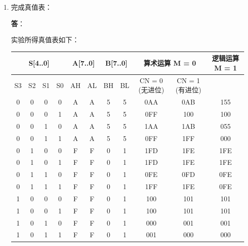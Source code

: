 \begin{enumerate}
    \item 完成真值表：
    
    \textbf{答}：
    
    实验所得真值表如下：
    
    \begin{table}[H]
        \centering
        \begin{tabular}{|c c c c|c c|c c|c|c|c|}
            \hline
            \multicolumn{4}{|c|}{S[4..0]} & \multicolumn{2}{c|}{A[7..0]} & \multicolumn{2}{c}{B[7..0]} & \multicolumn{2}{|c|}{算术运算 M = 0} & 逻辑运算 M = 1 \\
            \hline
            S3 & S2 & S1 & S0 & AH & AL & BH & BL & CN = 0 (无进位) & CN = 1 (有进位) & \\
            \hline
            0 & 0 & 0 & 0 & A & A & 5 & 5 & 0AA & 0AB & \cellcolor[HTML]{FFF9C4}155 \\
            \hline
            0 & 0 & 0 & 1 & A & A & 5 & 5 & 0FF & 100 & \cellcolor[HTML]{FFF9C4}100 \\
            \hline
            0 & 0 & 1 & 0 & A & A & 5 & 5 & \cellcolor[HTML]{FFF9C4}1AA & \cellcolor[HTML]{FFF9C4}1AB & 055 \\
            \hline
            0 & 0 & 1 & 1 & A & A & 5 & 5 & 0FF & \cellcolor[HTML]{FFF9C4}1FF & 000 \\
            \hline
            0 & 1 & 0 & 0 & F & F & 0 & 1 & 1FD & 1FE & \cellcolor[HTML]{FFF9C4}1FE \\
            \hline
            0 & 1 & 0 & 1 & F & F & 0 & 1 & 1FD & 1FE & \cellcolor[HTML]{FFF9C4}1FE \\
            \hline
            0 & 1 & 1 & 0 & F & F & 0 & 1 & 0FE & 0FD & 0FE \\
            \hline
            0 & 1 & 1 & 1 & F & F & 0 & 1 & \cellcolor[HTML]{FFF9C4}1FF & \cellcolor[HTML]{FFF9C4}1FE & 0FE \\
            \hline
            1 & 0 & 0 & 0 & F & F & 0 & 1 & 100 & 101 & \cellcolor[HTML]{FFF9C4}101 \\
            \hline
            1 & 0 & 0 & 1 & F & F & 0 & 1 & 100 & 101 & \cellcolor[HTML]{FFF9C4}101 \\
            \hline
            1 & 0 & 1 & 0 & F & F & 0 & 1 & \cellcolor[HTML]{FFF9C4}000 & \cellcolor[HTML]{FFF9C4}001 & 001 \\
            \hline
            1 & 0 & 1 & 1 & F & F & 0 & 1 & 001 & 000 & 000 \\

\end{tabular}
\end{table}
\end{enumerate}
